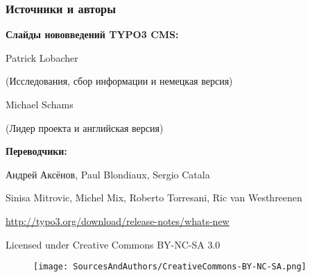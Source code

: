 \begin{frame}[fragile]
	\frametitle{Источники и авторы}

	\vspace{-0.6cm}

	\centerline{\textbf{Слайды нововведений TYPO3 CMS:}}

	\begin{center}
		\smaller
			\centerline{Patrick Lobacher}
			\centerline{(Исследования, сбор информации и немецкая версия)}
			\vspace{0.1cm}
			\centerline{Michael Schams}
			\centerline{(Лидер проекта и английская версия)}
		\normalsize
	\end{center}
	\vspace{-0.6cm}
	\begin{center}
		\smaller
			\centerline{\textbf{Переводчики:}}
			\centerline{Андрей Аксёнов, Paul Blondiaux, Sergio Catala}
			\centerline{Sinisa Mitrovic, Michel Mix, Roberto Torresani, Ric van Westhreenen}
		\normalsize
	\end{center}
	\vspace{-0.6cm}
	\smaller\begin{center}\url{http://typo3.org/download/release-notes/whats-new}\end{center}\normalsize

	\smaller\begin{center}Licensed under Creative Commons BY-NC-SA 3.0\end{center}\normalsize
	\begin{figure}\vspace*{-0.3cm}
		\texttt{[image: SourcesAndAuthors/CreativeCommons-BY-NC-SA.png]}
	\end{figure}

\end{frame}

